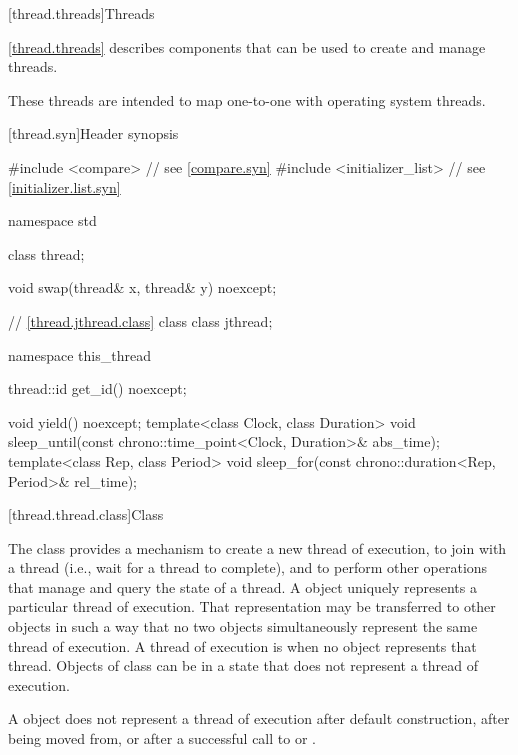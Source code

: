 [thread.threads]{Threads}

\pnum
\ref{thread.threads} describes components that can be used to create and manage threads.
\begin{note}
These threads are intended to map one-to-one with operating system threads.
\end{note}

[thread.syn]{Header  synopsis}

%
\begin{codeblock}
#include <compare>              // see \ref{compare.syn}
#include <initializer_list>     // see \ref{initializer.list.syn}

namespace std {
  class thread;

  void swap(thread& x, thread& y) noexcept;

  // \ref{thread.jthread.class} class 
  class jthread;

  namespace this_thread {
    thread::id get_id() noexcept;

    void yield() noexcept;
    template<class Clock, class Duration>
      void sleep_until(const chrono::time_point<Clock, Duration>& abs_time);
    template<class Rep, class Period>
      void sleep_for(const chrono::duration<Rep, Period>& rel_time);
  }
}
\end{codeblock}

[thread.thread.class]{Class }

\pnum
The class  provides a mechanism to create a new thread of execution, to join with
a thread (i.e., wait for a thread to complete), and to perform other operations that manage and
query the state of a thread. A  object uniquely represents a particular thread of
execution. That representation may be transferred to other  objects in such a way
that no two  objects simultaneously represent the same thread of execution. A
thread of execution is  when no  object represents that thread.
Objects of class  can be in a state that does not represent a thread of
execution.
\begin{note}
A  object does not represent a thread of execution after
default construction, after being moved from, or after a successful call to  or
.
\end{note}

